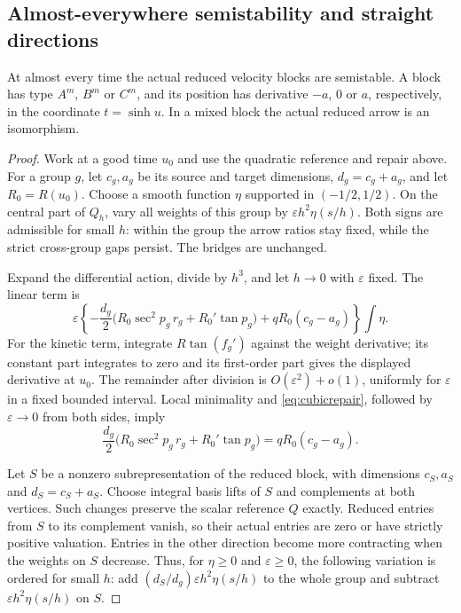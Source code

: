\subsection{Almost-everywhere semistability and straight directions}

\begin{proposition}\label{prop:aeharmonicity}
At almost every time the actual reduced velocity blocks are
semistable. A block has type $A^m$, $B^m$ or $C^m$, and its
position has derivative $-a$, $0$ or $a$, respectively, in the
coordinate $t=\sinh u$. In a mixed block the actual reduced arrow
is an isomorphism.
\end{proposition}

\begin{proof}
Work at a good time $u_0$ and use the quadratic reference and
repair above. For a group $g$, let $c_g,a_g$ be its source and
target dimensions, $d_g=c_g+a_g$, and let $R_0=R(u_0)$.
Choose a smooth function $\eta$ supported in $(-1/2,1/2)$.
On the central part of $Q_h$, vary all weights of this group by
$\varepsilon h^2\eta(s/h)$. Both signs are admissible for small
$h$: within the group the arrow ratios stay fixed, while the
strict cross-group gaps persist. The bridges are unchanged.

Expand the differential action, divide by $h^3$, and let
$h\to0$ with $\varepsilon$ fixed. The linear term is
\[
 \varepsilon\left\{
 -\frac{d_g}{2}\bigl(R_0\sec^2p_g\,r_g+R_0'\tan p_g\bigr)
       +qR_0(c_g-a_g)\right\}\int\eta.
\]
For the kinetic term, integrate $R\tan(f_g')$ against the
weight derivative; its constant part integrates to zero and its
first-order part gives the displayed derivative at $u_0$.
The remainder after division is $O(\varepsilon^2)+o(1)$,
uniformly for $\varepsilon$ in a fixed bounded interval.
Local minimality and \eqref{eq:cubicrepair}, followed by
$\varepsilon\to0$ from both sides, imply
\begin{equation}\label{eq:blockeuler}
 \frac{d_g}{2}\bigl(R_0\sec^2p_g\,r_g+R_0'\tan p_g\bigr)
       =qR_0(c_g-a_g).
\end{equation}

Let $S$ be a nonzero subrepresentation of the reduced block,
with dimensions $c_S,a_S$ and $d_S=c_S+a_S$. Choose integral
basis lifts of $S$ and complements at both vertices. Such changes
preserve the scalar reference $Q$ exactly. Reduced entries from
$S$ to its complement vanish, so their actual entries are zero
or have strictly positive valuation. Entries in the other
direction become more contracting when the weights on $S$
decrease. Thus, for $\eta\ge0$ and $\varepsilon\ge0$, the
following variation is ordered for small $h$: add
$(d_S/d_g)\varepsilon h^2\eta(s/h)$ to the whole group and
subtract $\varepsilon h^2\eta(s/h)$ on $S$.


\end{proof}
